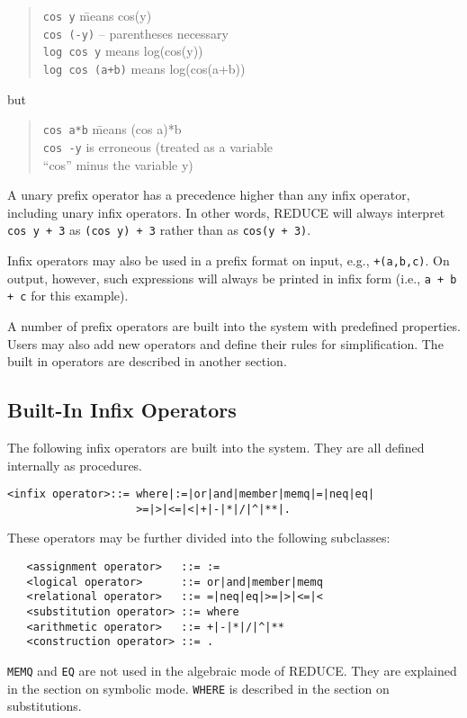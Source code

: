 \documentclass[11pt,letterpaper]{book}
\newcommand{\REDUCE}{REDUCE}
\begin{document}
\begin{quote}
\begin{tabbing}
{\tt cos y} \hspace{1.75in} \= means cos(y) \\
{\tt cos (-y)} \> -- parentheses necessary \\
{\tt log cos y} \>   means log(cos(y)) \\
{\tt log cos (a+b)} \> means log(cos(a+b))
\end{tabbing}
\end{quote}
but
\begin{quote}
\begin{tabbing}
{\tt cos a*b} \hspace{1.6in} \= means (cos a)*b \\
{\tt cos -y}  \> is erroneous (treated as a variable \\
\> ``cos'' minus the variable y)
\end{tabbing}
\end{quote}
A unary prefix operator has a precedence
 higher than any infix operator, including
unary infix operators. 
In other words, {\REDUCE} will always interpret {\tt cos~y + 3} as
{\tt (cos~y) + 3} rather than as {\tt cos(y + 3)}.

Infix operators may also be used in a prefix format on input, e.g.,
{\tt +(a,b,c)}.  On output, however, such expressions will always be
printed in infix form (i.e., {\tt a + b + c} for this example).

A number of prefix operators are built into the system with predefined
properties. Users may also add new operators and define their rules for
simplification. The built in operators are described in another section.

\subsection*{Built-In Infix Operators}

The following infix operators are built into the
system.  They are all defined internally as procedures.
{\small\begin{verbatim}
<infix operator>::= where|:=|or|and|member|memq|=|neq|eq|
                    >=|>|<=|<|+|-|*|/|^|**|.
\end{verbatim}}
These operators may be further divided into the following subclasses:
{\small\begin{verbatim}
   <assignment operator>   ::= :=
   <logical operator>      ::= or|and|member|memq
   <relational operator>   ::= =|neq|eq|>=|>|<=|<
   <substitution operator> ::= where
   <arithmetic operator>   ::= +|-|*|/|^|**
   <construction operator> ::= .
\end{verbatim}}
{\tt MEMQ} and {\tt EQ} are not used in the algebraic mode of
{\REDUCE}.  They are explained in the section on symbolic mode.
{\tt WHERE} is described in the section on substitutions.
\end{document}
